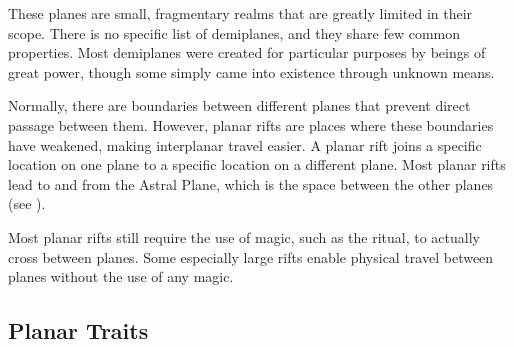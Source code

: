      These planes are small, fragmentary realms that are greatly limited in their scope.
    There is no specific list of demiplanes, and they share few common properties.
    Most demiplanes were created for particular purposes by beings of great power, though some simply came into existence through unknown means.

    Normally, there are boundaries between different planes that prevent direct passage between them.
    However, planar rifts are places where these boundaries have weakened, making interplanar travel easier.
    A planar rift joins a specific location on one plane to a specific location on a different plane.
    Most planar rifts lead to and from the Astral Plane, which is the space between the other planes (see ).

    Most planar rifts still require the use of magic, such as the  ritual, to actually cross between planes.
    Some especially large rifts enable physical travel between planes without the use of any magic.

  \subsection{Planar Traits}
